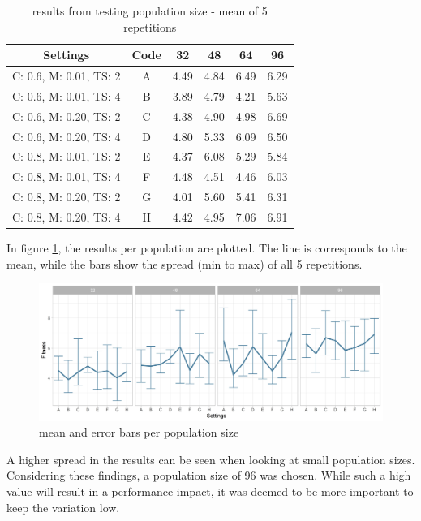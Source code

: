 \begin{table}[ht]
	\centering
	\begin{tabular}{ c|c|cccc  }
		\hline
		Settings & Code & 32 & 48 & 64 & 96\\
		\hline
		C: 0.6, M: 0.01, TS: 2   	& A & 4.49 & 4.84 & 6.49 & 6.29 \\
		C: 0.6, M: 0.01, TS: 4		& B & 3.89 & 4.79 & 4.21 & 5.63 \\ 
		C: 0.6, M: 0.20, TS: 2 		& C & 4.38 & 4.90 & 4.98 & 6.69 \\
		C: 0.6, M: 0.20, TS: 4    	& D & 4.80 & 5.33 & 6.09 & 6.50 \\
		C: 0.8, M: 0.01, TS: 2   	& E & 4.37 & 6.08 & 5.29 & 5.84 \\
		C: 0.8, M: 0.01, TS: 4		& F & 4.48 & 4.51 & 4.46 & 6.03 \\
		C: 0.8, M: 0.20, TS: 2 		& G & 4.01 & 5.60 & 5.41 & 6.31 \\
		C: 0.8, M: 0.20, TS: 4    	& H & 4.42 & 4.95 & 7.06 & 6.91 \\
		\hline
	\end{tabular}
	\caption{results from testing population size - mean of 5 repetitions}
	\label{tab:hyperparameter_tuning:pop_settings_results}
\end{table}

In figure \ref{fig:hyperparameter_tuning:population_results}, the results per population are plotted. The line is corresponds to the mean, while the bars show the spread (min to max) of all 5 repetitions.
\begin{figure}[ht] 
	\includegraphics[width=1\linewidth]{simulations/population/plots/comparison}
	\caption{mean and error bars per population size}
	\label{fig:hyperparameter_tuning:population_results}
\end{figure}

A higher spread in the results can be seen when looking at small population sizes. Considering these findings, a population size of 96 was chosen. While such a high value will result in a performance impact, it was deemed to be more important to keep the variation low. 

